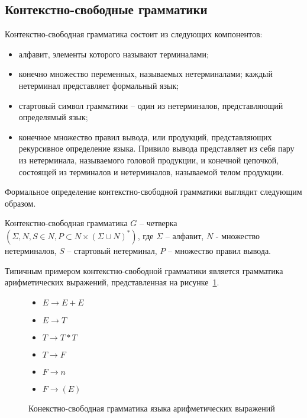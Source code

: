 \subsection{Контекстно-свободные грамматики}
Контекстно-свободная грамматика состоит из следующих компонентов:
\begin{itemize}
    \item алфавит, элементы которого называют терминалами;
    \item конечно множество переменных, называемых нетерминалами; каждый нетерминал представляет формальный язык;
    \item стартовый символ грамматики -- один из нетерминалов, представляющий определямый язык;
    \item конечное множество правил вывода, или продукций, представляющих рекурсивное определение языка.
    Привило вывода представляет из себя пару из нетерминала, называемого головой продукции, и конечной цепочкой,
    состоящей из терминалов и нетерминалов, называемой телом продукции.
\end{itemize}
Формальное определение контекстно-свободной грамматики выглядит следующим образом.
\begin{definition}
Контекстно-свободная грамматика $G$ -- четверка $(\Sigma, N, S \in N, P \subset N \times (\Sigma \cup N)^*)$,
где $\Sigma$ -- алфавит, $N$ - множество нетерминалов, $S$ -- стартовый нетерминал, $P$ -- множество правил вывода.
\end{definition}
Типичным примером контекстно-свободной грамматики является грамматика арифметических выражений, представленная на рисунке~\ref{cf-expr}.
\begin{figure}[H]
    \centering
    \begin{varwidth}{\textwidth}
    \begin{itemize}
        \item[] $E \rightarrow E + E$
        \item[] $E \rightarrow T$
        \item[] $T \rightarrow T * T$
        \item[] $T \rightarrow F$
        \item[] $F \rightarrow n$
        \item[] $F \rightarrow (E)$
    \end{itemize}
    \end{varwidth}
    \caption{Конекстно-свободная грамматика языка арифметических выражений}
    \label{cf-expr}
\end{figure}
